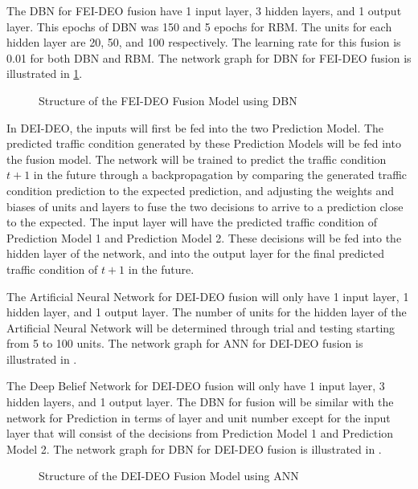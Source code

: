 The DBN for FEI-DEO fusion have 1 input layer, 3 hidden layers, and 1 output layer. This epochs of DBN was 150 and 5 epochs for RBM. The units for each hidden layer are 20, 50, and 100 respectively. The learning rate for this fusion is 0.01 for both DBN and RBM. The network graph for DBN for FEI-DEO fusion is illustrated in \ref{fig:feideo_dbn}. 

\begin{figure}[h]
	\centering
	\captionsetup{justification=centering}
	\caption{Structure of the FEI-DEO Fusion Model using DBN}
	\label{fig:feideo_dbn}
\end{figure}

In DEI-DEO, the inputs will first be fed into the two Prediction Model. The predicted traffic condition generated by these Prediction Models will be fed into the fusion model. The network will be trained to predict the traffic condition $t+1$ in the future through a backpropagation by comparing the generated traffic condition prediction to the expected prediction, and adjusting the weights and biases of units and layers to fuse the two decisions to arrive to a prediction close to the expected. The input layer will have the predicted traffic condition of Prediction Model 1 and Prediction Model 2. These decisions will be fed into the hidden layer of the network, and into the output layer for the final predicted traffic condition of $t+1$ in the future. 

The Artificial Neural Network for DEI-DEO fusion will only have 1 input layer, 1 hidden layer, and 1 output layer. The number of units for the hidden layer of the Artificial Neural Network will be determined through trial and testing starting from 5 to 100 units. The network graph for ANN for DEI-DEO fusion is illustrated in . 

The Deep Belief Network for DEI-DEO fusion will only have 1 input layer, 3 hidden layers, and 1 output layer. The DBN for fusion will be similar with the network for Prediction in terms of layer and unit number except for the input layer that will consist of the decisions from Prediction Model 1 and Prediction Model 2. The network graph for DBN for DEI-DEO fusion is illustrated in .

\begin{figure}[h]
	\centering
	\captionsetup{justification=centering}
	\caption{Structure of the DEI-DEO Fusion Model using ANN}
	\label{fig:deideo_ann}
\end{figure}


